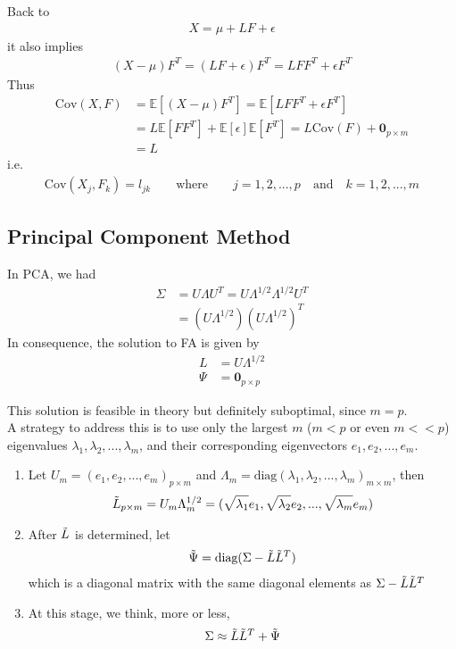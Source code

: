 \documentclass[12pt]{extarticle}
\newcommand{\<}{\langle}
\renewcommand{\>}{\rangle}
\theoremstyle{definition}
\begin{document}
Back to
\begin{align*}
    X=\mu +LF+\epsilon
\end{align*}
it also implies
\begin{align*}
    (X-\mu)F^T = (LF+\epsilon)F^T = LFF^T + \epsilon F^T
\end{align*}
Thus
\begin{align*}
    \text{Cov}(X,F) &= \mathbb{E}[(X-\mu)F^T] = \mathbb{E}[LFF^T + \epsilon F^T]\\
    &= L\mathbb{E}[FF^T] +\mathbb{E}[\epsilon]\mathbb{E}[F^T] = L\text{Cov}(F) + \textbf{0}_{p\times m}\\
    &= L
\end{align*}
i.e.
\begin{align*}
    \text{Cov}(X_j, F_k)=l_{jk} \qquad \text{where} \qquad j=1,2,...,p \quad \text{and} \quad k=1,2,...,m
\end{align*}

\subsection{Principal Component Method}
\begin{tcolorbox}[enhanced, drop fuzzy shadow, title=Principal Component Method]
In PCA, we had
\begin{align*}
    \Sigma &= U\Lambda U^T = U\Lambda^{1/2}\Lambda^{1/2}U^T\\
    &= (U\Lambda^{1/2})(U\Lambda^{1/2})^T
\end{align*}
In consequence, the solution to FA is given by
\begin{align*}
    L &= U\Lambda^{1/2}\\
    \Psi &= \textbf{0}_{p\times p}
\end{align*}
\end{tcolorbox}
This solution is feasible in theory but definitely suboptimal, since $m=p$.\\
A strategy to address this is to use only the largest $m$ ($m<p$ or even $m<<p$) eigenvalues $\lambda_1,\lambda_2,...,\lambda_m$, and their corresponding eigenvectors $e_1,e_2,...,e_m$.
\begin{enumerate}
    \item Let $U_m=(e_1,e_2,...,e_m)_{p\times m}$ and $\Lambda_m=\text{diag}(\lambda_1,\lambda_2,...,\lambda_m)_{m\times m}$, then
    \begin{align*}
        \Tilde{L}_{p\times m} = U_m \Lambda_m^{1/2} = (\sqrt{\lambda_1}e_1,\sqrt{\lambda_2}e_2,...,\sqrt{\lambda_m}e_m)
    \end{align*}
    \item After $\Tilde{L}$ is determined, let
    \begin{align*}
        \Tilde{\Psi}= \text{diag}(\Sigma-\Tilde{L}\Tilde{L}^T)
    \end{align*}
    which is a diagonal matrix with the same diagonal elements as $\Sigma-\Tilde{L}\Tilde{L}^T$
    \item At this stage, we think, more or less,
    \begin{align*}
        \Sigma \approx \Tilde{L}\Tilde{L}^T + \Tilde{\Psi}
    \end{align*}
\end{enumerate}
\end{document}
